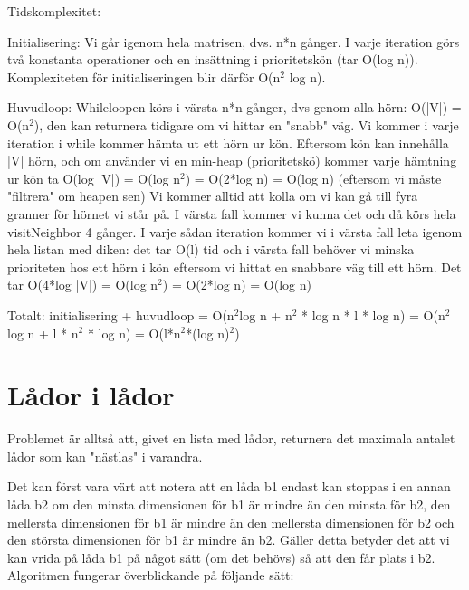 \documentclass[a4paper]{article}
\begin{document}
\noindent Tidskomplexitet:\newline

\noindent Initialisering: Vi går igenom hela matrisen, dvs. n*n gånger. I varje iteration görs två konstanta operationer och en insättning i prioritetskön (tar O(log n)). Komplexiteten för initialiseringen blir därför O(n$^2$ log n).\newline

\noindent Huvudloop: Whileloopen körs i värsta n*n gånger, dvs genom alla hörn: O(|V|) = O(n$^2$), den kan returnera tidigare om vi hittar en "snabb" väg. Vi kommer i varje iteration i while kommer hämta ut ett hörn ur kön. Eftersom kön kan innehålla |V| hörn, och om använder vi en min-heap (prioritetskö) kommer varje hämtning ur kön ta O(log |V|) = O(log n$^2$) = O(2*log n) = O(log n) (eftersom vi måste "filtrera" om heapen sen)
Vi kommer alltid att kolla om vi kan gå till fyra granner för hörnet vi står på. I värsta fall kommer vi kunna det och då körs hela visitNeighbor 4 gånger. I varje sådan iteration kommer vi i värsta fall leta igenom hela listan med diken: det tar O(l) tid och i värsta fall behöver vi minska prioriteten hos ett hörn i kön eftersom vi hittat en snabbare väg till ett hörn. Det tar O(4*log |V|) = O(log n$^2$) =  O(2*log n) = O(log n)\newline

\noindent Totalt: initialisering + huvudloop = O(n$^2$log n + n$^2$ * log n * l * log n) = O(n$^2$log n + l * n$^2$ * log n) = O(l*n$^2$*(log n)$^2$)


\newpage
\section{Lådor i lådor}

Problemet är alltså att, givet en lista med lådor, returnera det maximala antalet lådor som kan "nästlas" i varandra.

Det kan först vara värt att notera att en låda b1 endast kan stoppas i en annan låda b2 om den minsta dimensionen för b1 är mindre än den minsta för b2, den mellersta dimensionen för b1 är mindre än den mellersta dimensionen för b2 och den största dimensionen för b1 är mindre än b2. Gäller detta betyder det att vi kan vrida på låda b1 på något sätt (om det behövs) så att den får plats i b2. \\ \newline Algoritmen fungerar överblickande på följande sätt: \newline
\end{document}
